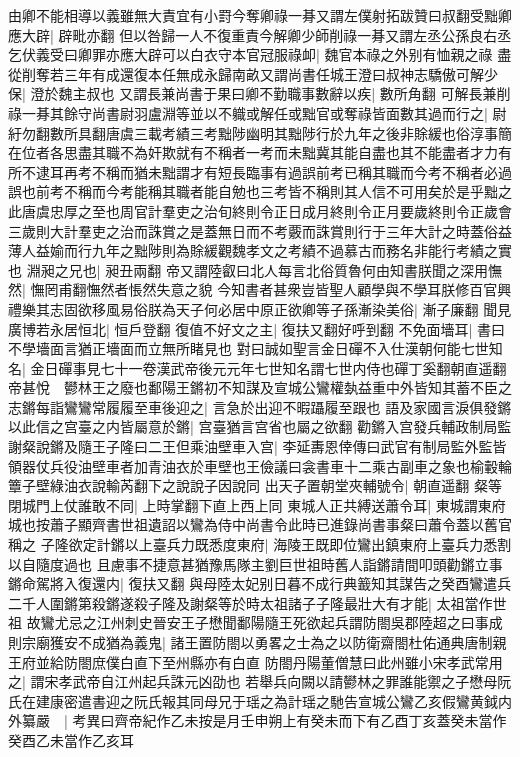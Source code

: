 由卿不能相導以義雖無大責宜有小罸今奪卿祿一朞又謂左僕射拓跋贊曰叔翻受黜卿應大辟|{
	辟毗亦翻}
但以咎歸一人不復重責今解卿少師削祿一朞又謂左丞公孫良右丞乞伏義受曰卿罪亦應大辟可以白衣守本官冠服祿卹|{
	魏官本祿之外别有恤親之祿}
盡從削奪若三年有成還復本任無成永歸南畝又謂尚書任城王澄曰叔神志驕傲可解少保|{
	澄於魏主叔也}
又謂長兼尚書于果曰卿不勤職事數辭以疾|{
	數所角翻}
可解長兼削祿一朞其餘守尚書尉羽盧淵等並以不軄或解任或黜官或奪祿皆面數其過而行之|{
	尉紆勿翻數所具翻唐虞三載考績三考黜陟幽明其黜陟行於九年之後非賖緩也俗淳事簡在位者各思盡其職不為奸欺就有不稱者一考而未黜冀其能自盡也其不能盡者才力有所不逮耳再考不稱而猶未黜謂才有短長臨事有過誤前考已稱其職而今考不稱者必過誤也前考不稱而今考能稱其職者能自勉也三考皆不稱則其人信不可用矣於是乎黜之此唐虞忠厚之至也周官計羣吏之治旬終則令正日成月終則令正月要歲終則令正歲會三歲則大計羣吏之治而誅賞之是蓋無日而不考覈而誅賞則行于三年大計之時蓋俗益薄人益媮而行九年之黜陟則為賖緩觀魏孝文之考績不過慕古而務名非能行考績之實也}
淵昶之兄也|{
	昶丑兩翻}
帝又謂陸叡曰北人每言北俗質魯何由知書朕聞之深用憮然|{
	憮罔甫翻憮然者悵然失意之貌}
今知書者甚衆豈皆聖人顧學與不學耳朕修百官興禮樂其志固欲移風易俗朕為天子何必居中原正欲卿等子孫漸染美俗|{
	漸子廉翻}
聞見廣博若永居恒北|{
	恒戶登翻}
復值不好文之主|{
	復扶又翻好呼到翻}
不免面墻耳|{
	書曰不學墻面言猶正墻面而立無所睹見也}
對曰誠如聖言金日磾不入仕漢朝何能七世知名|{
	金日磾事見七十一卷漢武帝後元元年七世知名謂七世内侍也磾丁奚翻朝直遥翻}
帝甚悅　鬰林王之廢也鄱陽王鏘初不知謀及宣城公鸞權埶益重中外皆知其蓄不臣之志鏘每詣鸞鸞常履履至車後迎之|{
	言急於出迎不暇躡履至跟也}
語及家國言淚俱發鏘以此信之宫臺之内皆屬意於鏘|{
	宫臺猶言宫省也屬之欲翻}
勸鏘入宫發兵輔政制局監謝粲說鏘及隨王子隆曰二王但乘油壁車入宫|{
	李延夀恩倖傳曰武官有制局監外監皆領器仗兵役油壁車者加青油衣於車壁也王儉議曰衾書車十二乘古副車之象也榆轂輪簟子壁綠油衣說輸芮翻下之說說子因說同}
出天子置朝堂夾輔號令|{
	朝直遥翻}
粲等閉城門上仗誰敢不同|{
	上時掌翻下直上西上同}
東城人正共縛送蕭令耳|{
	東城謂東府城也按蕭子顯齊書世祖遺詔以鸞為侍中尚書令此時已進錄尚書事粲曰蕭令蓋以舊官稱之}
子隆欲定計鏘以上臺兵力既悉度東府|{
	海陵王既即位鸞出鎮東府上臺兵力悉割以自隨度過也}
且慮事不捷意甚猶豫馬隊主劉巨世祖時舊人詣鏘請間叩頭勸鏘立事鏘命駕將入復還内|{
	復扶又翻}
與母陸太妃别日暮不成行典籖知其謀告之癸酉鸞遣兵二千人圍鏘第殺鏘遂殺子隆及謝粲等於時太祖諸子子隆最壯大有才能|{
	太祖當作世祖}
故鸞尤忌之江州刺史晉安王子懋聞鄱陽隨王死欲起兵謂防閤吳郡陸超之曰事成則宗廟獲安不成猶為義鬼|{
	諸王置防閤以勇畧之士為之以防衛齋閤杜佑通典唐制親王府並給防閤庶僕白直下至州縣亦有白直}
防閤丹陽董僧慧曰此州雖小宋孝武常用之|{
	謂宋孝武帝自江州起兵誅元凶劭也}
若舉兵向闕以請鬰林之罪誰能禦之子懋母阮氏在建康密遣書迎之阮氏報其同母兄于瑶之為計瑶之馳告宣城公鸞乙亥假鸞黄鉞内外纂嚴　|{
	考異曰齊帝紀作乙未按是月壬申朔上有癸未而下有乙酉丁亥蓋癸未當作癸酉乙未當作乙亥耳}
